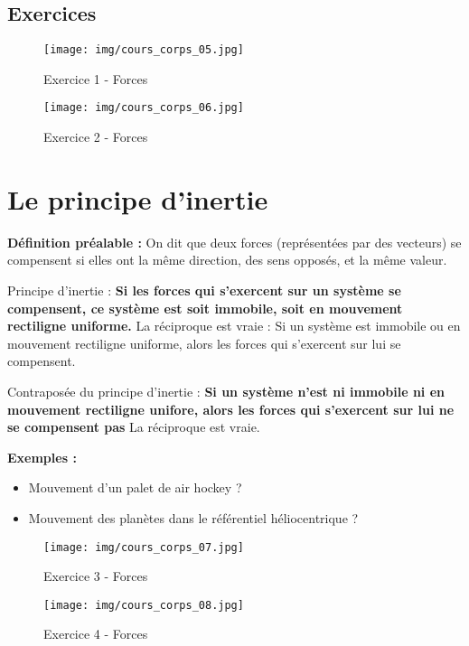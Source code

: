 \documentclass[a4paper,12pt]{article}
\begin{document}
\subsection*{Exercices}

\begin{figure}[H]
  \centering
  \texttt{[image: img/cours\_corps\_05.jpg]}
  \caption{\label{} Exercice 1 - Forces}
\end{figure}


\begin{figure}[H]
  \centering
  \texttt{[image: img/cours\_corps\_06.jpg]}
  \caption{\label{} Exercice 2 - Forces}
\end{figure}

\section*{Le principe d'inertie}

\begin{tcolorbox}[colback=green!10!white, colframe=green!75!black, title=Principe d'inertie]
  \textbf{Définition préalable :} On dit que deux forces (représentées par des vecteurs) se compensent si elles ont la même direction, des sens opposés, et la même valeur. \par
  \vspace{1em}
  Principe d'inertie : \textbf{Si les forces qui s'exercent sur un système se compensent, ce système est soit immobile, soit en mouvement rectiligne uniforme.} La réciproque est vraie : Si un système est immobile ou en mouvement rectiligne uniforme, alors les forces qui s'exercent sur lui se compensent. \par 
  \vspace{1em}
  Contraposée du principe d'inertie : \textbf{Si un système n'est ni immobile ni en mouvement rectiligne unifore, alors les forces qui s'exercent sur lui ne se compensent pas} La réciproque est vraie.
\end{tcolorbox}

\textbf{Exemples : }
\begin{itemize}
\item Mouvement d'un palet de air hockey ?
\vspace{3em}
\item Mouvement des planètes dans le référentiel héliocentrique ?
\vspace{3em}
\end{itemize}

\begin{figure}[H]
  \centering
  \texttt{[image: img/cours\_corps\_07.jpg]}
  \caption{\label{} Exercice 3 - Forces}
\end{figure}


\begin{figure}[H]
  \centering
  \texttt{[image: img/cours\_corps\_08.jpg]}
  \caption{\label{} Exercice 4 - Forces}
\end{figure}
\end{document}
